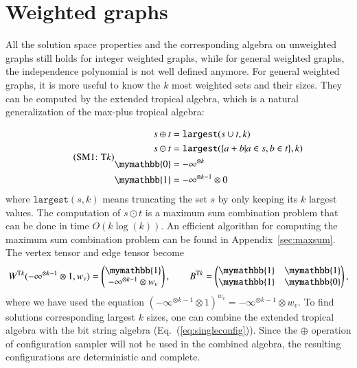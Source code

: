 \documentclass[onefignum, onetabnum]{siamart190516}
\newcommand{\eqname}[1]{\stepcounter{equation}\tag{\theequation : #1}}
\newcommand{\<}{\langle}
\renewcommand{\>}{\rangle}
\newcommand{\Eq}[1]{Eq.~(\ref{#1})}
\newcommand{\App}[1]{Appendix~\ref{#1}}
\begin{document}
\section{Weighted graphs}\label{sec:weighted}
All the solution space properties and the corresponding algebra on unweighted graphs still holds for integer weighted graphs, while for general weighted graphs, the independence polynomial is not well defined anymore.
For general weighted graphs, it is more useful to know the $k$ most weighted sets and their sizes.
They can be computed by the extended tropical algebra, which is a natural generalization of the max-plus tropical algebra:

\begin{equation}
\eqname{T$k$}
\begin{split}
    s \oplus t &= \texttt{largest}(s \cup t, k)\\
    s \odot t &= \texttt{largest}(\{a+b| a \in s, b\in t\}, k)\\
    \mymathbb{0} &= -\infty^{\otimes k}\\
    \mymathbb{1} &= -\infty^{\otimes k-1} \otimes 0
\end{split}\label{eq:ext-tropical}
\end{equation}
where $\texttt{largest}(s, k)$ means truncating the set $s$ by only keeping its $k$ largest values.
The computation of $s \odot t$ is a maximum sum combination problem that can be done in time $O(k\log(k))$.
An efficient algorithm for computing the maximum sum combination problem can be found in \App{sec:maxsum}.
The vertex tensor and edge tensor become
\begin{equation}
    W^{{\rm T}k}(-\infty^{\otimes k-1} \otimes 1, w_v) = \left(\begin{matrix}
        \mymathbb{1} \\
        -\infty^{\otimes k-1} \otimes w_v
    \end{matrix}\right),   
    \qquad
        B^{{\rm T}k} = \left(\begin{matrix}
        \mymathbb{1}  & \mymathbb{1} \\
        \mymathbb{1} & \mymathbb{0}
    \end{matrix}\right),
\end{equation}
where we have used the equation $(-\infty^{\otimes k-1} \otimes 1)^{w_v} = -\infty^{\otimes k-1} \otimes w_v$.
To find solutions corresponding largest $k$ sizes, one can combine the extended tropical algebra with the bit string algebra (\Eq{eq:singleconfig}).
Since the $\oplus$ operation of configuration sampler will not be used in the combined algebra, the resulting configurations are deterministic and complete.
\end{document}
